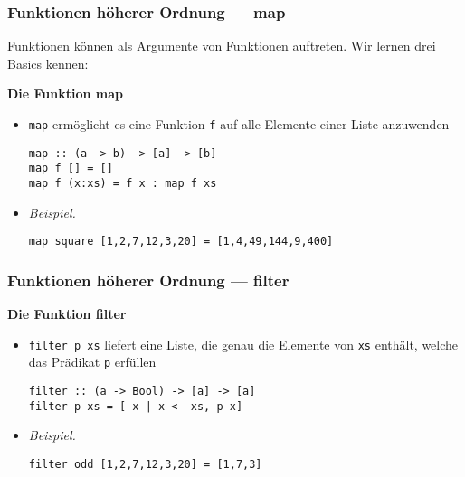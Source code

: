 \documentclass{beamer}
\begin{document}
\begin{frame}[fragile] \frametitle{Funktionen höherer Ordnung --- map}
	\footnotesize
	Funktionen können als Argumente von Funktionen auftreten. Wir lernen drei Basics kennen: \pause
	
	\textbf{Die Funktion map}
	\begin{itemize}
		\item \texttt{map} ermöglicht es eine Funktion \texttt{f} auf alle Elemente einer Liste anzuwenden \\[6pt]
		\begin{lstlisting}[style=bg]
map :: (a -> b) -> [a] -> [b] 
map f [] = [] 
map f (x:xs) = f x : map f xs
		\end{lstlisting}
		\item \textit{Beispiel.} \\[6pt]
		\begin{lstlisting}[style=bg]
map square [1,2,7,12,3,20] = [1,4,49,144,9,400]
		\end{lstlisting}
	\end{itemize}
\end{frame}

\begin{frame}[fragile] \frametitle{Funktionen höherer Ordnung --- filter}
	\footnotesize
	\textbf{Die Funktion filter}
	\begin{itemize}
		\item \texttt{filter p xs} liefert eine Liste, die genau die Elemente von \texttt{xs} enthält, welche das Prädikat \texttt{p} erfüllen \\[6pt]
		\begin{lstlisting}[style=bg]
filter :: (a -> Bool) -> [a] -> [a] 
filter p xs = [ x | x <- xs, p x]
		\end{lstlisting}
		\item \textit{Beispiel.} \\[6pt]
		\begin{lstlisting}[style=bg]
filter odd [1,2,7,12,3,20] = [1,7,3]
		\end{lstlisting}
	\end{itemize}
\end{frame}
\end{document}
